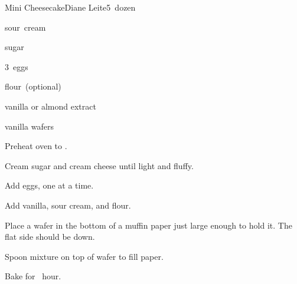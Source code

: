 \begin{recipe}{Mini Cheesecake}{Diane Leite}{5~dozen}

\begin{ingredients}
\item {} 
\item {} sour~cream
\item {} sugar
\item 3~eggs
\item {} flour~(optional)
\item {} vanilla or almond extract
\item vanilla wafers
\end{ingredients}

\begin{directions}
\item Preheat oven to .
\item Cream sugar and cream cheese until light and fluffy.
\item Add eggs, one at a time.
\item Add vanilla, sour cream, and flour.
\item Place a wafer in the bottom of a muffin paper just large enough to hold it. The flat side should be down.
\item Spoon mixture on top of wafer to fill paper.
\item Bake for \half~hour.
\end{directions}
\end{recipe}
